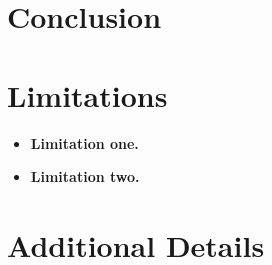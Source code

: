 \documentclass[11pt,letterpaper]{softmax_preprint}
\begin{document}
\section{Conclusion}
\lipsum[11][1-3]

\section*{Limitations}
\begin{itemize}[leftmargin=*]
\item \textbf{Limitation one.} \lipsum[12][1-2]
\item \textbf{Limitation two.} \lipsum[13][1-2]
\end{itemize}



\clearpage
\appendix
\section{Additional Details}
\label{sec:appendix}
\lipsum[14][1-4]
\end{document}
